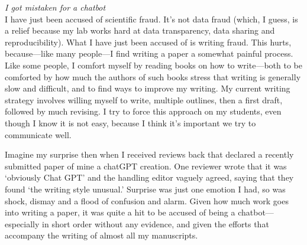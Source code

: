 \documentclass[11pt]{article}
\begin{document}

\renewcommand{\refname}{\CHead{}}


\emph{I got mistaken for a chatbot}\\%

I have just been accused of scientific fraud. It's not data fraud (which, I guess, is a relief because my lab works hard at data transparency, data sharing and reproducibility). What I have just been accused of is writing fraud. This hurts, because---like many people---I find writing a paper a somewhat painful process. %
Like some people, I comfort myself by reading books on how to write---both to be comforted by how much the authors of such books stress that writing is generally slow and difficult, and to find ways to improve my writing. My current writing strategy involves willing myself to write, multiple outlines, then a first draft, followed by much revising. I try to force this approach on my students, even though I know it is not easy, because I think it's important we try to communicate well.


Imagine my surprise then when I received reviews back that declared a recently submitted paper of mine a chatGPT creation. One reviewer wrote that it was `obviously Chat GPT' and the handling editor vaguely agreed, saying that they found `the writing style unusual.' Surprise was just one emotion I had, so was shock, dismay and a flood of confusion and alarm. Given how much work goes into writing a paper, it was quite a hit to be accused of being a chatbot---especially in short order without any evidence, and given the efforts that accompany the writing of almost all my manuscripts. 
\end{document}
